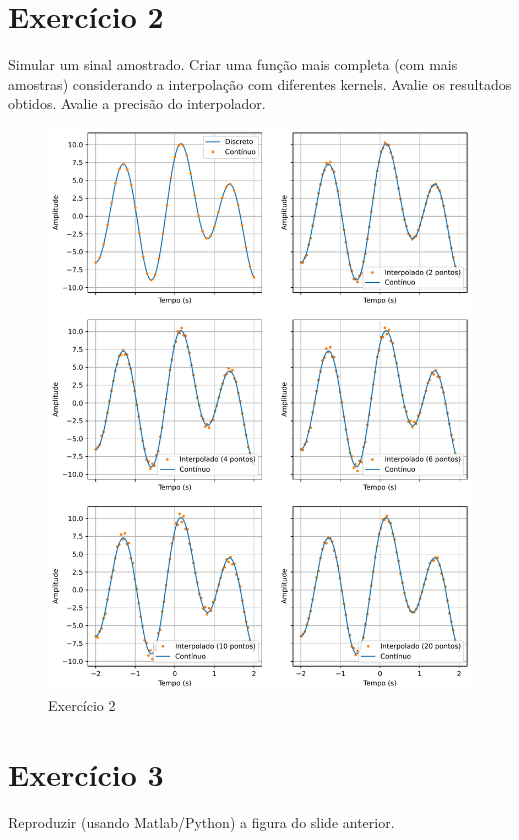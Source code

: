 \documentclass[english]{sbrt}
\begin{document}
\section{Exercício 2}

Simular um sinal amostrado. Criar uma função mais completa (com mais amostras) considerando a interpolação com diferentes kernels. Avalie os resultados obtidos. Avalie a precisão do interpolador.

\begin{figure}[htb]
    \centering
    \includegraphics[width=0.95\linewidth]{interpolation.pdf}
    \caption{Exercício 2}
    \label{fig:Exercício 2}
\end{figure}

\section{Exercício 3}

Reproduzir (usando Matlab/Python) a figura do slide anterior.
\end{document}
